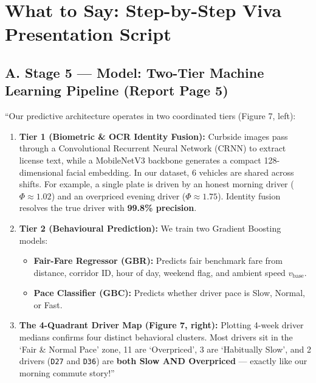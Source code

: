 \documentclass[10pt, a4paper]{article}
\begin{document}
\section{What to Say: Step-by-Step Viva Presentation Script}

\subsection{A. Stage 5 --- Model: Two-Tier Machine Learning Pipeline (Report Page 5)}
\begin{speaking}
\footnotesize
``Our predictive architecture operates in two coordinated tiers (Figure 7, left):
\begin{enumerate}\setlength{\itemsep}{0.8pt}\setlength{\parskip}{0pt}
  \item \textbf{Tier 1 (Biometric \& OCR Identity Fusion):} Curbside images pass through a Convolutional Recurrent Neural Network (CRNN) to extract license text, while a MobileNetV3 backbone generates a compact 128-dimensional facial embedding. In our dataset, 6 vehicles are shared across shifts. For example, a single plate is driven by an honest morning driver (\(\Phi \approx 1.02\)) and an overpriced evening driver (\(\Phi \approx 1.75\)). Identity fusion resolves the true driver with \textbf{99.8\% precision}.
  \item \textbf{Tier 2 (Behavioural Prediction):} We train two Gradient Boosting models:
    \begin{itemize}\setlength{\itemsep}{0.6pt}\setlength{\parskip}{0pt}
      \item \textbf{Fair-Fare Regressor (GBR):} Predicts fair benchmark fare from distance, corridor ID, hour of day, weekend flag, and ambient speed \(v_{\mathrm{base}}\).
      \item \textbf{Pace Classifier (GBC):} Predicts whether driver pace is Slow, Normal, or Fast.
    \end{itemize}
  \item \textbf{The 4-Quadrant Driver Map (Figure 7, right):} Plotting 4-week driver medians confirms four distinct behavioral clusters. Most drivers sit in the `Fair \& Normal Pace' zone, 11 are `Overpriced', 3 are `Habitually Slow', and 2 drivers (\texttt{D27} and \texttt{D36}) are \textbf{both Slow AND Overpriced} --- exactly like our morning commute story!''
\end{enumerate}
\end{speaking}
\end{document}
